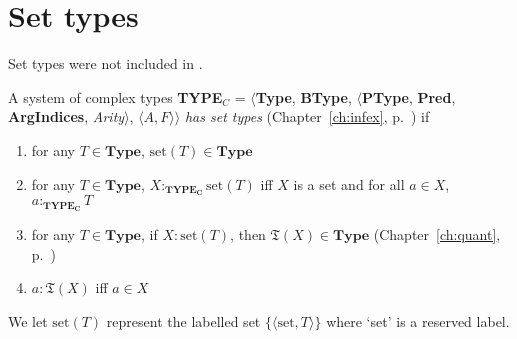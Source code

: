 \section{Set types}
\label{app:settypes}

Set types were not included in \cite{Cooper2012}.

A system of complex types {\bf TYPE$_C$} = $\langle${\bf Type}, {\bf BType},
$\langle$\textbf{PType}, {\bf Pred}, \textbf{ArgIndices}, {\it
  Arity\/}$\rangle$, $\langle A,F\rangle$$\rangle$ \textit{has set
  types} (Chapter~\ref{ch:infex}, p.~\pageref{ex:settypes}) if
\begin{enumerate} 
 
\item for any $T \in \textbf{Type}$, $\mathrm{set}(T) \in \textbf{Type}$ 
 
\item for any $T \in \textbf{Type}$, 
$X:_{\mathbf{TYPE_C}}\mathrm{set}(T)$ iff  $X$ is a set and 
for all $a\in X$, $a:_{\mathbf{TYPE_C}}T$

\item for any $T \in \textbf{Type}$, if $X:\mathrm{set}(T)$, then
  $\mathfrak{T}(X)\in \textbf{Type}$ (Chapter~\ref{ch:quant},
  p.~\pageref{ex:mathfrakT})

  
\item $a:\mathfrak{T}(X)$ iff $a\in X$
   
 
\end{enumerate}

We let $\mathrm{set}(T)$ represent the labelled set
$\{\langle\mathrm{set},T\rangle\}$ where `set' is a reserved
label.


 

